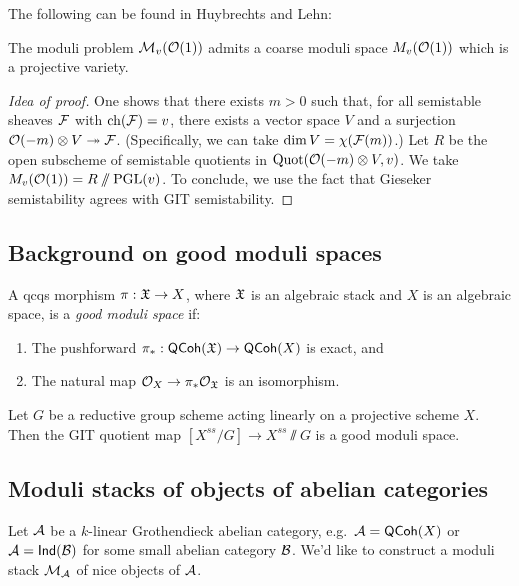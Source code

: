 \documentclass{amsart}
\begin{document}
The following can be found in Huybrechts and Lehn:

\begin{thm}
	The moduli problem $\mathcal{M}_v(\mathcal{O}(1))$ admits a coarse moduli space $M_v(\mathcal{O}(1))$ which is a projective variety.
\end{thm}

\begin{proof}[Idea of proof]
	One shows that there exists $m > 0$ such that, for all semistable sheaves $\mathcal{F}$ with $\mathrm{ch}(\mathcal{F}) = v$, there exists a vector space $V$ and a surjection $\mathcal{O}(-m) \otimes V \twoheadrightarrow \mathcal{F}$.
	(Specifically, we can take $\dim V = \chi(\mathcal{F}(m))$.)
	Let $R$ be the open subscheme of semistable quotients in $\operatorname{Quot}(\mathcal{O}(-m) \otimes V, v)$.
	We take $M_v(\mathcal{O}(1)) = R \mathbin{/\mkern-6mu/} \mathrm{PGL}(v)$.
	To conclude, we use the fact that Gieseker semistability agrees with GIT semistability.
\end{proof}

\subsection{Background on good moduli spaces}

\begin{dfn}
	A qcqs morphism $\pi: \mathfrak{X} \to X$, where $\mathfrak{X}$ is an algebraic stack and $X$ is an algebraic space, is a \emph{good moduli space} if:
	\begin{enumerate}
		\item The pushforward $\pi_*: \mathsf{QCoh}(\mathfrak{X}) \to \mathsf{QCoh}(X)$ is exact, and
		\item The natural map $\mathcal{O}_X \to \pi_* \mathcal{O}_{\mathfrak{X}}$ is an isomorphism.
	\end{enumerate}
\end{dfn}

\begin{ex}
	Let $G$ be a reductive group scheme acting linearly on a projective scheme $X$.
	Then the GIT quotient map $[X^{ss} / G] \to X^{ss} \sslash G$ is a good moduli space.
\end{ex}

\subsection{Moduli stacks of objects of abelian categories}

Let $\mathcal{A}$ be a $k$-linear Grothendieck abelian category, e.g.\ $\mathcal{A} = \mathsf{QCoh}(X)$ or $\mathcal{A} = \mathsf{Ind}(\mathcal{B})$ for some small abelian category $\mathcal{B}$.
We'd like to construct a moduli stack $\mathcal{M}_{\mathcal{A}}$ of nice objects of $\mathcal{A}$.
\end{document}
